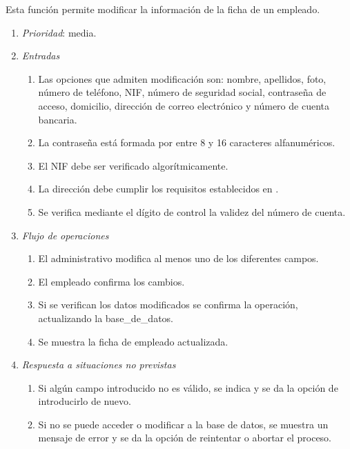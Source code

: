
 \label{fun:editarempleado}
	Esta función permite modificar la información de la ficha de un empleado.

	\begin{enumerate}
		\item \textit{Prioridad}: media.
		\item \textit{Entradas}
		\begin{enumerate}
			\item Las opciones que admiten modificación son: nombre, apellidos, foto, número de teléfono, NIF, número de seguridad social, contraseña de acceso, domicilio, dirección de correo electrónico y número de cuenta bancaria.
			\item La contraseña está formada por entre 8 y 16 caracteres alfanuméricos.
			\item El \gls{NIF} debe ser verificado algorítmicamente.
			\item La dirección debe cumplir los requisitos establecidos en .
			\item Se verifica mediante el dígito de control la validez del número de cuenta.
		\end{enumerate}
		\item \textit{Flujo de operaciones}
		\begin{enumerate}
			\item El administrativo modifica al menos uno de los diferentes campos.
			\item El empleado confirma los cambios.
			\item Si se verifican los datos modificados se confirma la operación, actualizando la \gls{base_de_datos}.
			\item Se muestra la ficha de empleado actualizada.
		\end{enumerate}
		\item \textit{Respuesta a situaciones no previstas}
		\begin{enumerate}
			\item Si algún campo introducido no es válido, se indica y se da la opción de introducirlo de nuevo.
			\item Si no se puede acceder o modificar a la base de datos, se muestra un mensaje de error y se da la opción de reintentar o abortar el proceso.
		\end{enumerate}
	\end{enumerate}
